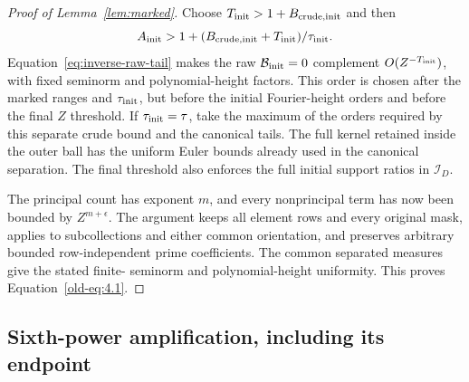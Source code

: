 \documentclass[12pt]{article}
\begin{document}
\begin{proof}[Proof of Lemma~\ref{lem:marked}]
Choose \(T_{\rm init}>1+B_{\rm crude,init}\) and then
\[
 A_{\rm init}>1+(B_{\rm crude,init}+T_{\rm init})/\tau_{\rm init}.
\]
Equation~\eqref{eq:inverse-raw-tail} makes the raw
\(\mathcal B_{\rm init}=0\) complement \(O(Z^{-T_{\rm init}})\), with
fixed seminorm and polynomial-height factors.  This order is chosen after
the marked ranges and \(\tau_{\rm init}\), but before the initial
Fourier-height orders and before the final \(Z\) threshold.  If
\(\tau_{\rm init}=\tau\), take the maximum of the orders required by this
separate crude bound and the canonical tails.  The full kernel retained
inside the outer ball has the uniform Euler bounds already used in the
canonical separation.  The final threshold also enforces the full initial support
ratios in \(\mathcal I_D\).

The principal count has exponent \(m\), and every nonprincipal term has
now been bounded by \(Z^{m+\epsilon}\).  The argument keeps all element
rows and every original mask, applies to subcollections and either common
orientation, and preserves arbitrary bounded row-independent prime
coefficients.  The common separated measures give the stated finite-
seminorm and polynomial-height uniformity.  This proves
Equation~\eqref{old-eq:4.1}.
\end{proof}

\subsection{Sixth-power amplification, including its endpoint}
\end{document}
